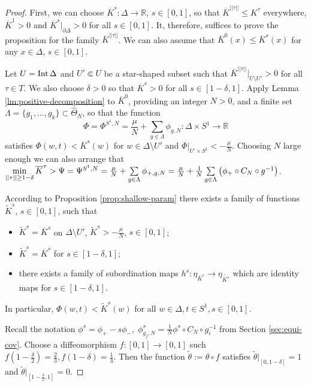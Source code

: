 \documentclass[12pt]{paper}
\theoremstyle{plain}
\theoremstyle{definition}
\newcommand{\wt}{\widetilde}
\newcommand{\wh}{\widehat}
\newcommand{\ol}{\overline}
\newcommand{\p}{\partial}
\newcommand{\R}{{\mathbb{R}}}
\newcommand{\Int}{{\rm Int\,}} %
\renewcommand{\min}{{\rm min}}
\numberwithin{figure}{section}
\begin{document}
   \begin{proof}   
First, we can choose $\ol K^s: \Delta \to \R$, $s \in [0,1]$, so that $\ol K^{||\tau||} \leq K^{ \tau }$ everywhere, $\ol K^1 > 0$ and $\ol K^s|_{\p \Delta} >0$ for all $s\in[0,1]$. It, therefore, suffices to prove the proposition for the family $\ol K^{||\tau||}$. We can also assume that $\ol K^0(x) \leq \ol K^s(x)$ for any $x \in \Delta$, $s \in [0,1]$. 

      
   Let $U=\Int \Delta$ and $U'\Subset U$ be a star-shaped subset such that $\ol K^{||\tau||}|_{U\setminus U'}>0$ for all $\tau\in T$. We also choose $\delta>0$ so that $\ol K^s > 0$ for all $s \in [1-\delta, 1]$. Apply Lemma \ref{lm:positive-decomposition} to $\ol K^0$, providing an integer $N>0$, and a finite set $\Lambda=\{g_1,\dots, g_k\}\subset\wh \Theta_N$, so that the function 
   $$\Phi=\Phi^{S^1,N}=\frac\mu N+ \sum\limits_{g\in \Lambda}\phi_{g,N} :\Delta\times S^1\to\R$$ satisfies
 $\Phi (w,t)< \ol K^s(w)$ for $w\in \Delta\setminus U'$  and $\Phi|_{U'\times S^1}<-\frac\mu N$. Choosing $N$ large enough we  can also arrange that  $\mathop{\min}\limits_{||\tau||\geq1-\delta} \ol K^\tau>
 \Psi =\Psi^{S^1,N}=\frac\mu N+ \sum\limits_{g\in 
 \Lambda}\phi_{+,g,N}=\frac\mu N+ \frac1N\sum\limits_{g\in 
 \Lambda}\left(\phi_{+}\circ C_N\circ g^{-1}\right)$.
  
According to Proposition  \ref{prop:shallow-param} there exists  a family of  functions $\wt K^s $, $s\in[0,1]$,
such that
	 \begin{itemize}
	 \item $\wt K^s=\ol K^s$ on 
	 $\Delta \setminus  U'$,  $\wt{K}^s > -\frac\mu N$,  $s\in[0,1]$;
	 \item $\wt K^s= \ol K^s$ for $s\in[1-\delta,1]$;
\item there exists a family of subordination maps   $h^s: \eta_{\ol K^s}\to \eta_{\wt{K^s}}$
which are identity maps 	for $s\in[1-\delta,1]$.
\end{itemize} 

  In particular, $\Phi(w,t)<\wt K^s(w)$ for all $w\in \Delta, t\in S^1, s\in[0,1]$. 
 
 Recall the notation $\phi^s= \phi_+-s\phi_-,\; \phi^s_{g_j,N}=\frac1N\phi^s\circ C_N\circ g_i^{-1} $ from Section \ref{sec:equi-cov}.
  Choose a diffeomorphism $f:[0,1]\to[0,1]$ such $f(1-\frac\delta2)=\frac23, f(1-\delta)=\frac13$. Then the function $\wt\theta:=\theta\circ f$ satisfies  $\wt\theta|_{[0,1-\delta]} = 1$  and    $\wt\theta|_{[1-\frac\delta2,1]} = 0$.
  

\end{proof}
\end{document}
